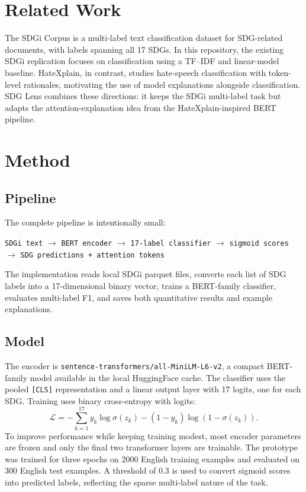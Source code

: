 \documentclass[10pt]{article}
\begin{document}
\section{Related Work}
The SDGi Corpus is a multi-label text classification dataset for SDG-related
documents, with labels spanning all 17 SDGs. In this repository, the existing
SDGi replication focuses on classification using a TF--IDF and linear-model
baseline. HateXplain, in contrast, studies hate-speech classification with
token-level rationales, motivating the use of model explanations alongside
classification. SDG Lens combines these directions: it keeps the SDGi
multi-label task but adapts the attention-explanation idea from the
HateXplain-inspired BERT pipeline.

\section{Method}
\subsection{Pipeline}
The complete pipeline is intentionally small:

\begin{center}
\small
\texttt{SDGi text} $\rightarrow$ \texttt{BERT encoder} $\rightarrow$
\texttt{17-label classifier} $\rightarrow$ \texttt{sigmoid scores} $\rightarrow$
\texttt{SDG predictions + attention tokens}
\end{center}

The implementation reads local SDGi parquet files, converts each list of SDG
labels into a 17-dimensional binary vector, trains a BERT-family classifier,
evaluates multi-label F1, and saves both quantitative results and example
explanations.

\subsection{Model}
The encoder is \texttt{sentence-transformers/all-MiniLM-L6-v2}, a compact
BERT-family model available in the local HuggingFace cache. The classifier uses
the pooled \texttt{[CLS]} representation and a linear output layer with 17
logits, one for each SDG. Training uses binary cross-entropy with logits:
\[
\mathcal{L} =
- \sum_{k=1}^{17} y_k \log \sigma(z_k)
- (1-y_k)\log(1-\sigma(z_k)).
\]
To improve performance while keeping training modest, most encoder parameters
are frozen and only the final two transformer layers are trainable. The
prototype was trained for three epochs on 2000 English training examples and
evaluated on 300 English test examples. A threshold of 0.3 is used to convert
sigmoid scores into predicted labels, reflecting the sparse multi-label nature
of the task.
\end{document}
